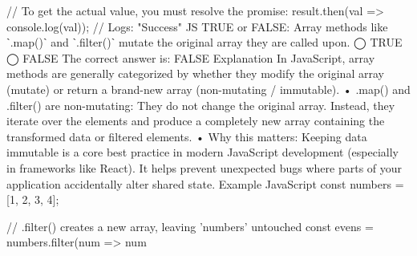 // To get the actual value, you must resolve the promise:
result.then(val => console.log(val)); // Logs: "Success"
JS
TRUE or FALSE: Array methods like ˋ.map()ˋ and ˋ.filter()ˋ mutate the original array they are called upon.
◯ TRUE
◯ FALSE
The correct answer is:
FALSE
Explanation
In JavaScript, array methods are generally categorized by whether they modify the original array (mutate) or return a brand-new array (non-mutating / immutable).
•	.map() and .filter() are non-mutating: They do not change the original array. Instead, they iterate over the elements and produce a completely new array containing the transformed data or filtered elements.
•	Why this matters: Keeping data immutable is a core best practice in modern JavaScript development (especially in frameworks like React). It helps prevent unexpected bugs where parts of your application accidentally alter shared state.
Example
JavaScript
const numbers = [1, 2, 3, 4];

// .filter() creates a new array, leaving 'numbers' untouched
const evens = numbers.filter(num => num %

